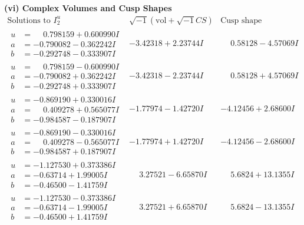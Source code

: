 \documentclass[1p]{elsarticle_modified}
\theoremstyle{definition}
\newcommand{\I}{\sqrt{-1}}
\begin{document}
\newpage\flushleft \textbf{(vi) Complex Volumes and Cusp Shapes}
$$\begin{array}{c|c|c}  
\text{Solutions to }I^u_{2}& \I (\text{vol} + \sqrt{-1}CS) & \text{Cusp shape}\\
 \hline 
\begin{aligned}
u &= \phantom{-}0.798159 + 0.600990 I \\
a &= -0.790082 - 0.362242 I \\
b &= -0.292748 - 0.333907 I\end{aligned}
 & -3.42318 + 2.23744 I & \phantom{-}0.58128 - 4.57069 I \\ \hline\begin{aligned}
u &= \phantom{-}0.798159 - 0.600990 I \\
a &= -0.790082 + 0.362242 I \\
b &= -0.292748 + 0.333907 I\end{aligned}
 & -3.42318 - 2.23744 I & \phantom{-}0.58128 + 4.57069 I \\ \hline\begin{aligned}
u &= -0.869190 + 0.330016 I \\
a &= \phantom{-}0.409278 + 0.565077 I \\
b &= -0.984587 - 0.187907 I\end{aligned}
 & -1.77974 - 1.42720 I & -4.12456 + 2.68600 I \\ \hline\begin{aligned}
u &= -0.869190 - 0.330016 I \\
a &= \phantom{-}0.409278 - 0.565077 I \\
b &= -0.984587 + 0.187907 I\end{aligned}
 & -1.77974 + 1.42720 I & -4.12456 - 2.68600 I \\ \hline\begin{aligned}
u &= -1.127530 + 0.373386 I \\
a &= -0.63714 + 1.99005 I \\
b &= -0.46500 - 1.41759 I\end{aligned}
 & \phantom{-}3.27521 - 6.65870 I & \phantom{-}5.6824 + 13.1355 I \\ \hline\begin{aligned}
u &= -1.127530 - 0.373386 I \\
a &= -0.63714 - 1.99005 I \\
b &= -0.46500 + 1.41759 I\end{aligned}
 & \phantom{-}3.27521 + 6.65870 I & \phantom{-}5.6824 - 13.1355 I \\ \hline\begin{aligned}

\end{aligned}
\end{array}$$
\end{document}

